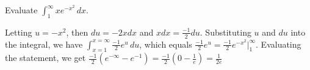 \begin{Exercise}[label=int_meth4]
Evaluate $\int_1^{\infty}xe^{-x^2}\,dx$. 
\end{Exercise}

\begin{Answer}[ref=int_meth4]
Letting $u = -x^2$, then $du = -2x dx$ and $x dx = \frac{-1}{2}du$. 
Substituting $u$ and $du$ into the integral, we have $\int_{x = 1}^{x 
= \infty} \frac{-1}{2}e^u\,du$, which equals $\frac{-1}{2}e^u = 
\frac{-1}{2}e^{-x^2}|_1^{\infty}$. Evaluating the statement, we get 
$\frac{-1}{2}(e^{-\infty} - e^{-1}) = \frac{-1}{2}(0-\frac{1}{e}) = 
\frac{1}{2e}$
\end{Answer}